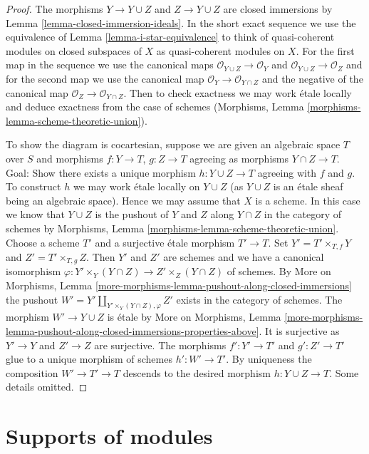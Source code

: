 \documentclass{stacks-project}
\theoremstyle{plain}
\theoremstyle{definition}
\theoremstyle{remark}
\numberwithin{equation}{subsection}
\begin{document}
\begin{proof}
The morphisms $Y \to Y \cup Z$ and $Z \to Y \cup Z$ are closed immersions
by Lemma \ref{lemma-closed-immersion-ideals}. In the short exact sequence
we use the equivalence of Lemma \ref{lemma-i-star-equivalence} to think of
quasi-coherent modules on closed subspaces of $X$ as quasi-coherent modules
on $X$. For the first map in the sequence we use the canonical maps
$\mathcal{O}_{Y \cup Z} \to \mathcal{O}_Y$ and
$\mathcal{O}_{Y \cup Z} \to \mathcal{O}_Z$
and for the second map we use the canonical map
$\mathcal{O}_Y \to \mathcal{O}_{Y \cap Z}$ and
the negative of the canonical map
$\mathcal{O}_Z \to \mathcal{O}_{Y \cap Z}$. Then to check
exactness we may work \'etale locally and deduce exactness
from the case of schemes
(Morphisms, Lemma \ref{morphisms-lemma-scheme-theoretic-union}).

\medskip\noindent
To show the diagram is cocartesian, suppose we are given an algebraic space
$T$ over $S$ and morphisms $f : Y \to T$, $g : Z \to T$ agreeing as morphisms
$Y \cap Z \to T$. Goal: Show there exists a unique morphism
$h : Y \cup Z \to T$ agreeing with $f$ and $g$.
To construct $h$ we may work \'etale locally on $Y \cup Z$
(as $Y \cup Z$ is an \'etale sheaf being an algebraic space).
Hence we may assume that $X$ is a scheme.
In this case we know that $Y \cup Z$ is the pushout
of $Y$ and $Z$ along $Y \cap Z$ in the category of schemes
by Morphisms, Lemma \ref{morphisms-lemma-scheme-theoretic-union}.
Choose a scheme $T'$ and a surjective \'etale morphism $T' \to T$.
Set $Y' = T' \times_{T, f} Y$ and $Z' = T' \times_{T, g} Z$.
Then $Y'$ and $Z'$ are schemes and we have a canonical isomorphism
$\varphi : Y' \times_Y (Y \cap Z) \to Z' \times_Z (Y \cap Z)$
of schemes. By More on Morphisms, Lemma
\ref{more-morphisms-lemma-pushout-along-closed-immersions}
the pushout $W' = Y' \amalg_{Y' \times_Y (Y \cap Z), \varphi} Z'$
exists in the category of schemes.
The morphism $W' \to Y \cup Z$ is \'etale by
More on Morphisms, Lemma
\ref{more-morphisms-lemma-pushout-along-closed-immersions-properties-above}.
It is surjective as $Y' \to Y$ and $Z' \to Z$ are surjective.
The morphisms $f' : Y' \to T'$ and $g' : Z' \to T'$
glue to a unique morphism of schemes $h' : W' \to T'$.
By uniqueness the composition $W' \to T' \to T$
descends to the desired morphism $h : Y \cup Z \to T$.
Some details omitted.
\end{proof}






\section{Supports of modules}
\label{section-support}
\end{document}
